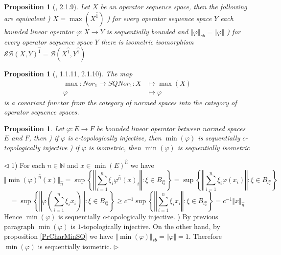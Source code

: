 \documentclass[12pt]{article}
\newtheorem{proposition}[theorem]{Proposition}
\newenvironment{proof}{\par $\triangleleft$}{$\triangleright$}
\begin{document}
\begin{proposition}[\cite{LamOpFolgen}, 2.1.9]\label{PrCharMaxSQ}
Let $X$ be an operator sequence space, then the following are equivalent
) $X=\max(X^{\wideparen{1}})$
) for every operator sequence space $Y$ each bounded linear operator $\varphi:X\to Y$ is sequentially bounded and $\Vert\varphi\Vert_{sb}=\Vert\varphi\Vert$
) for every operator sequence space $Y$ there is isometric isomorphism $\mathcal{SB}(X,Y)^{\wideparen{1}}=\mathcal{B}(X^{\wideparen{1}},Y^{\wideparen{1}})$
\end{proposition}

\begin{proposition}[\cite{LamOpFolgen}, 1.1.11, 2.1.10]\label{PrMaxFucntor}
The map
$$
\begin{aligned}
\max : Nor_1 \to SQNor_1 : X&\mapsto \max(X)\\
\varphi&\mapsto\varphi
\end{aligned}
$$
is a covariant functor from the category of normed spaces into the category of operator sequence spaces.
\end{proposition}

\begin{proposition}\label{PrMinPreserveEmbedings} Let $\varphi:E\to F$ be bounded linear operator between normed spaces $E$ and $F$, then 
) if $\varphi$ is $c$-topologically injective, then $\min(\varphi)$ is sequentially $c$-topologically injective
) if $\varphi$ is isometric, then $\min(\varphi)$ is sequentially isometric
\end{proposition}
\begin{proof} 1) For each $n\in\mathbb{N}$ and $x\in \min(E)^{\wideparen{n}}$ we have
$$
\Vert \min(\varphi)^{\wideparen{n}}(x)\Vert_{\wideparen{n}}
=\sup\left\{\left\Vert\sum\limits_{i=1}^n\xi_i \varphi^{\wideparen{n}}(x)_i\right\Vert:\xi\in B_{l_2^n}\right\}
=\sup\left\{\left\Vert\sum\limits_{i=1}^n\xi_i \varphi(x_i)\right\Vert:\xi\in B_{l_2^n}\right\}
$$
$$
=\sup\left\{\left\Vert\varphi\left(\sum\limits_{i=1}^n\xi_i x_i\right)\right\Vert:\xi\in B_{l_2^n}\right\}
\geq c^{-1}\sup\left\{\left\Vert\sum\limits_{i=1}^n\xi_i x_i\right\Vert:\xi\in B_{l_2^n}\right\}
=c^{-1}\Vert x\Vert_{\wideparen{n}}
$$
Hence $\min(\varphi)$ is sequentially $c$-topologically injective.
) By previous paragraph $\min(\varphi)$ is $1$-topologically injective. On the other hand, by proposition \ref{PrCharMinSQ} we have $\Vert\min(\varphi)\Vert_{sb}=\Vert\varphi\Vert=1$. Therefore $\min(\varphi)$ is sequentially isometric.
\end{proof}
\end{document}
